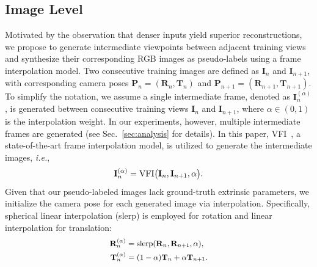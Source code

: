 \subsection{Image Level}

Motivated by the observation that denser inputs yield superior reconstructions, we propose to generate intermediate viewpoints between adjacent training views and synthesize their corresponding RGB images as pseudo-labels using a frame interpolation model. Two consecutive training images are defined as $\mathbf{I}_{n}$ and $\mathbf{I}_{n+1}$, with corresponding camera poses $\mathbf{P}_{n}=(\mathbf{R}_{n},\mathbf{T}_{n})$ and $\mathbf{P}_{n+1}=(\mathbf{R}_{n+1},\mathbf{T}_{n+1})$. 
To simplify the notation, we assume a single intermediate frame, denoted as $\mathbf{I}^{(\alpha)}_{n}$, is generated between consecutive training views $\mathbf{I}_{n}$ and $\mathbf{I}_{n+1}$, where $\alpha \in (0,1)$ is the interpolation weight. In our experiments, however, multiple intermediate frames are generated (see Sec.~\ref{sec:analysis} for details).
In this paper, VFI~\cite{seo2025bim}, a state-of-the-art frame interpolation model, is utilized to generate the intermediate images, \emph{i.e.},
\begin{equation}
\small
\mathbf{I}^{(\alpha)}_{n} = \mathrm{VFI}\big(\mathbf{I}_{n}, \mathbf{I}_{n+1},\alpha \big).
\end{equation}Given that our pseudo-labeled images lack ground-truth extrinsic parameters, we initialize the camera pose for each generated image via interpolation. Specifically, spherical linear interpolation (slerp) is employed for rotation and linear interpolation for translation:
\begin{equation}
\small
\begin{split}
\mathbf{R}^{(\alpha)}_n & = \mathrm{slerp}(\mathbf{R}_{n}, \mathbf{R}_{n+1}, \alpha), \\
\mathbf{T}^{(\alpha)}_n & = (1 - \alpha)  \mathbf{T}_{n} + \alpha \mathbf{T}_{n+1}.
\end{split}
\label{Eq(alpha)}
\end{equation}

